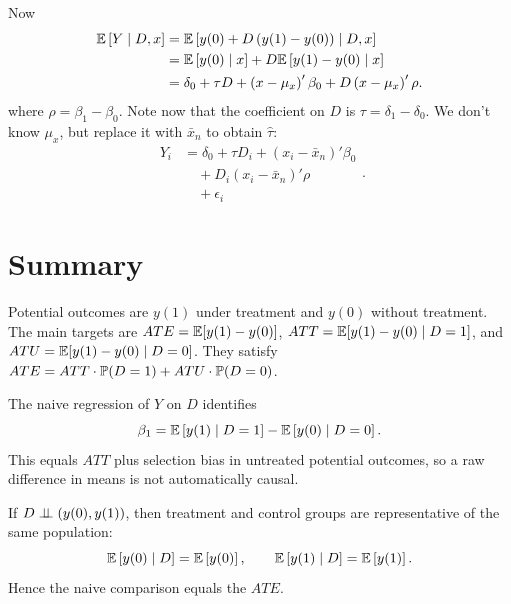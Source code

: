 \begin{proposition}
	Now
	\begin{align*}
		\E\left[Y \mid D, x\right]
		&= \E\left[y(0) + D\left(y(1)-y(0)\right) \mid D, x\right] \\
		&= \E\left[y(0) \mid x\right] + D\E\left[y(1)-y(0) \mid x\right] \\
		&= \delta_0 + \tau D + \left(x-\mu_x\right)'\beta_0 + D\left(x-\mu_x\right)'\rho
	.\end{align*}
		where $\rho = \beta_1-\beta_0$. Note now that the coefficient on $D$ is $\tau = \delta_1 - \delta_0$. We don't know $\mu_x$, but replace it with $\bar{x}_n$ to obtain $\hat{\tau}$:
		\[
			\begin{aligned}
				Y_i
				&= \delta_0 + \tau D_i + \left(x_i-\bar{x}_n\right)'\beta_0 \\
				&\quad + D_i\left(x_i-\bar{x}_n\right)'\rho \\
				&\quad + \epsilon_i
			\end{aligned}
		.\] 
\end{proposition}

\section{Summary}

\begin{remark}
	Potential outcomes are $y(1)$ under treatment and $y(0)$ without treatment.
	The main targets are $ATE = \E[y(1)-y(0)]$, $ATT = \E[y(1)-y(0)\mid D=1]$, and $ATU = \E[y(1)-y(0)\mid D=0]$.
	They satisfy $ATE = ATT \cdot \P(D=1) + ATU \cdot \P(D=0)$.
\end{remark}

\begin{remark}
	The naive regression of $Y$ on $D$ identifies
	\[
		\beta_1 = \E\left[y(1)\mid D=1\right] - \E\left[y(0)\mid D=0\right]
	.\]
	This equals $ATT$ plus selection bias in untreated potential outcomes, so a raw difference in means is not automatically causal.
\end{remark}

\begin{remark}
	If $D \ind \left(y(0),y(1)\right)$, then treatment and control groups are representative of the same population:
	\[
		\E\left[y(0)\mid D\right] = \E\left[y(0)\right], \qquad
		\E\left[y(1)\mid D\right] = \E\left[y(1)\right]
	.\]
	Hence the naive comparison equals the $ATE$.
\end{remark}

